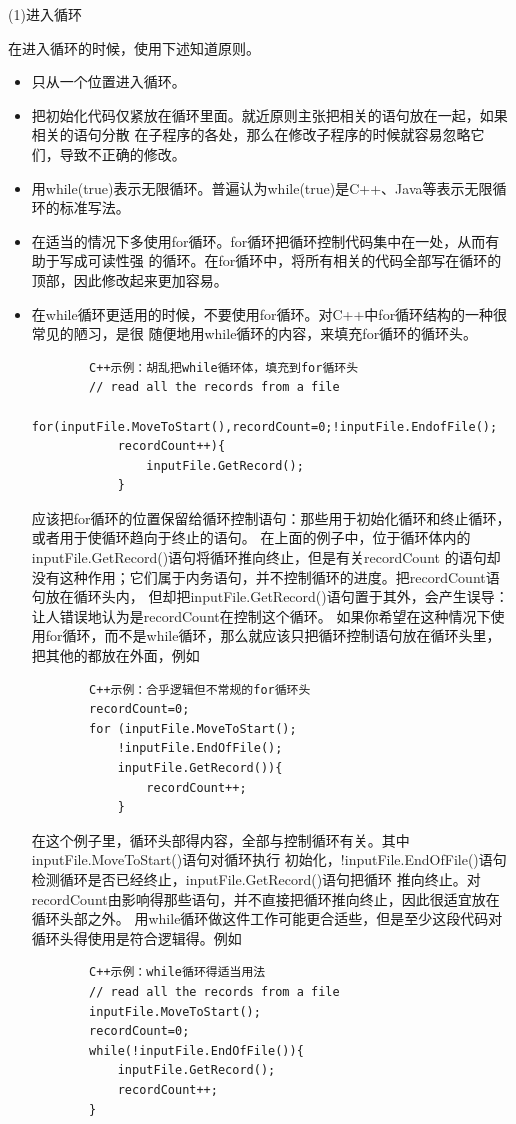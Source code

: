 \documentclass{article}
\begin{document}
\par
(1)进入循环
\par
在进入循环的时候，使用下述知道原则。
\begin{itemize}
    \item 只从一个位置进入循环。
    \item 把初始化代码仅紧放在循环里面。就近原则主张把相关的语句放在一起，如果相关的语句分散
    在子程序的各处，那么在修改子程序的时候就容易忽略它们，导致不正确的修改。
    \item 用while(true)表示无限循环。普遍认为while(true)是C++、Java等表示无限循环的标准写法。
    \item 在适当的情况下多使用for循环。for循环把循环控制代码集中在一处，从而有助于写成可读性强
    的循环。在for循环中，将所有相关的代码全部写在循环的顶部，因此修改起来更加容易。
    \item 在while循环更适用的时候，不要使用for循环。对C++中for循环结构的一种很常见的陋习，是很
    随便地用while循环的内容，来填充for循环的循环头。
    \begin{lstlisting}
        C++示例：胡乱把while循环体，填充到for循环头
        // read all the records from a file
        for(inputFile.MoveToStart(),recordCount=0;!inputFile.EndofFile();
            recordCount++){
                inputFile.GetRecord();
            }
    \end{lstlisting}
    应该把for循环的位置保留给循环控制语句：那些用于初始化循环和终止循环，或者用于使循环趋向于终止的语句。
    在上面的例子中，位于循环体内的inputFile.GetRecord()语句将循环推向终止，但是有关recordCount
    的语句却没有这种作用；它们属于内务语句，并不控制循环的进度。把recordCount语句放在循环头内，
    但却把inputFile.GetRecord()语句置于其外，会产生误导：让人错误地认为是recordCount在控制这个循环。
    如果你希望在这种情况下使用for循环，而不是while循环，那么就应该只把循环控制语句放在循环头里，
    把其他的都放在外面，例如
    \begin{lstlisting}
        C++示例：合乎逻辑但不常规的for循环头
        recordCount=0;
        for (inputFile.MoveToStart();
            !inputFile.EndOfFile();
            inputFile.GetRecord()){
                recordCount++;
            }
    \end{lstlisting}
    在这个例子里，循环头部得内容，全部与控制循环有关。其中inputFile.MoveToStart()语句对循环执行
    初始化，!inputFile.EndOfFile()语句检测循环是否已经终止，inputFile.GetRecord()语句把循环
    推向终止。对recordCount由影响得那些语句，并不直接把循环推向终止，因此很适宜放在循环头部之外。
    用while循环做这件工作可能更合适些，但是至少这段代码对循环头得使用是符合逻辑得。例如
    \begin{lstlisting}
        C++示例：while循环得适当用法
        // read all the records from a file
        inputFile.MoveToStart();
        recordCount=0;
        while(!inputFile.EndOfFile()){
            inputFile.GetRecord();
            recordCount++;
        }
    \end{lstlisting}
\end{itemize}
\end{document}
